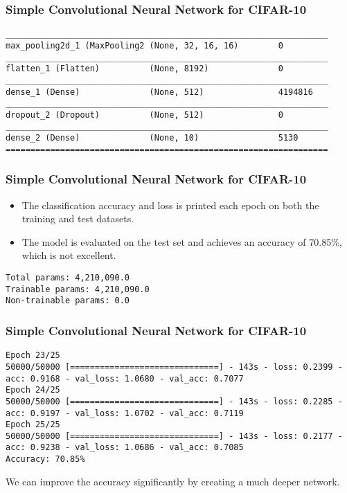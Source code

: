 \begin{frame}[fragile] \frametitle{Simple Convolutional Neural Network for CIFAR-10}

\begin{lstlisting}
_________________________________________________________________
max_pooling2d_1 (MaxPooling2 (None, 32, 16, 16)        0        
_________________________________________________________________
flatten_1 (Flatten)          (None, 8192)              0        
_________________________________________________________________
dense_1 (Dense)              (None, 512)               4194816  
_________________________________________________________________
dropout_2 (Dropout)          (None, 512)               0        
_________________________________________________________________
dense_2 (Dense)              (None, 10)                5130      
=================================================================
\end{lstlisting}
\end{frame}


\begin{frame}[fragile] \frametitle{Simple Convolutional Neural Network for CIFAR-10}
\begin{itemize}
\item The classification accuracy and loss is printed each epoch on both the training and test datasets. 
\item The model is evaluated on the test set and achieves an accuracy of 70.85\%, which is not excellent.
\end{itemize}
\begin{lstlisting}
Total params: 4,210,090.0
Trainable params: 4,210,090.0
Non-trainable params: 0.0
\end{lstlisting}
\end{frame}

\begin{frame}[fragile] \frametitle{Simple Convolutional Neural Network for CIFAR-10}
\begin{lstlisting}
Epoch 23/25
50000/50000 [==============================] - 143s - loss: 0.2399 - acc: 0.9168 - val_loss: 1.0680 - val_acc: 0.7077
Epoch 24/25
50000/50000 [==============================] - 143s - loss: 0.2285 - acc: 0.9197 - val_loss: 1.0702 - val_acc: 0.7119
Epoch 25/25
50000/50000 [==============================] - 143s - loss: 0.2177 - acc: 0.9238 - val_loss: 1.0686 - val_acc: 0.7085
Accuracy: 70.85%
\end{lstlisting}
We can improve the accuracy significantly by creating a much deeper network. 
\end{frame}

